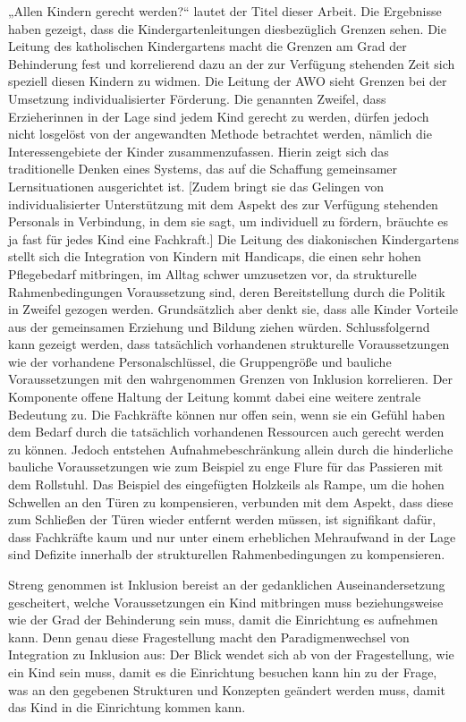 „Allen Kindern gerecht werden?“ lautet der Titel dieser Arbeit. 
Die Ergebnisse haben gezeigt, dass die Kindergartenleitungen diesbezüglich Grenzen sehen. 
Die Leitung des katholischen Kindergartens macht die Grenzen am Grad der Behinderung fest und korrelierend dazu an der zur Verfügung stehenden Zeit sich speziell diesen Kindern zu widmen. Die Leitung der AWO sieht Grenzen bei der Umsetzung individualisierter Förderung. Die genannten Zweifel, dass Erzieherinnen in der Lage sind jedem Kind gerecht zu werden, dürfen jedoch nicht losgelöst von der angewandten Methode betrachtet werden, nämlich die Interessengebiete der Kinder zusammenzufassen. Hierin zeigt sich das traditionelle Denken eines Systems, das auf die Schaffung gemeinsamer Lernsituationen ausgerichtet ist. [Zudem bringt sie das Gelingen von individualisierter Unterstützung mit dem Aspekt des zur Verfügung stehenden Personals in Verbindung, in dem sie sagt, um individuell zu fördern, bräuchte es ja fast für jedes Kind eine Fachkraft.]
Die Leitung des diakonischen Kindergartens stellt sich die Integration von Kindern mit Handicaps, die einen sehr hohen Pflegebedarf mitbringen, im Alltag schwer umzusetzen vor, da strukturelle Rahmenbedingungen Voraussetzung sind, deren Bereitstellung durch die Politik in Zweifel gezogen werden. Grundsätzlich aber denkt sie, dass alle Kinder Vorteile aus der gemeinsamen Erziehung und Bildung ziehen würden.
Schlussfolgernd kann gezeigt werden, dass tatsächlich vorhandenen strukturelle Voraussetzungen wie der vorhandene Personalschlüssel, die Gruppengröße und bauliche Voraussetzungen mit den wahrgenommen Grenzen von Inklusion korrelieren. Der Komponente offene Haltung der Leitung kommt dabei eine weitere zentrale Bedeutung zu. 
Die Fachkräfte können nur offen sein, wenn sie ein Gefühl haben dem Bedarf durch die tatsächlich vorhandenen Ressourcen auch gerecht werden zu können. 
Jedoch entstehen Aufnahmebeschränkung allein durch die hinderliche bauliche Voraussetzungen wie zum Beispiel zu enge Flure für das Passieren mit dem Rollstuhl. 
Das Beispiel des eingefügten Holzkeils als Rampe, um die hohen Schwellen an den Türen zu kompensieren, verbunden mit dem Aspekt, dass diese zum Schließen der Türen wieder entfernt werden müssen, ist signifikant dafür, dass Fachkräfte kaum und nur unter einem erheblichen Mehraufwand in der Lage sind Defizite innerhalb der strukturellen Rahmenbedingungen zu kompensieren.

Streng genommen ist Inklusion bereist an der gedanklichen Auseinandersetzung gescheitert, welche Voraussetzungen ein Kind mitbringen muss beziehungsweise wie der Grad der Behinderung sein muss, damit die Einrichtung es aufnehmen kann. 
Denn genau diese Fragestellung macht den Paradigmenwechsel von Integration zu Inklusion aus: Der Blick wendet sich ab von der Fragestellung, wie ein Kind sein muss, damit es die Einrichtung besuchen kann hin zu der Frage, was an den gegebenen Strukturen und Konzepten geändert werden muss, damit das Kind in die Einrichtung kommen kann.

